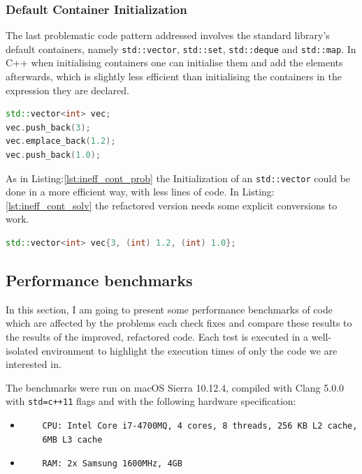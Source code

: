 \subsubsection{Default Container Initialization}
\par The last problematic code pattern addressed involves the standard library's default containers, namely \verb|std::vector|, \verb|std::set|, \verb|std::deque| and \verb|std::map|. In C++ when initialising containers one can initialise them and add the elements afterwards, which is slightly less efficient than initialising the containers in the expression they are declared. \medskip
\begin{lstlisting}[language=c++, frame=single ,caption={Inefficient way of creating containers}, label={lst:ineff_cont_prob}]
std::vector<int> vec;
vec.push_back(3);
vec.emplace_back(1.2);
vec.push_back(1.0);
\end{lstlisting}
\par As in Listing:\ref{lst:ineff_cont_prob} the Initialization of an \verb|std::vector| could be done in a more efficient way, with less lines of code. In Listing:\ref{lst:ineff_cont_solv}  the refactored version needs some explicit conversions to work.
\begin{lstlisting}[language=c++, frame=single ,caption={A faster way of initialising}, label={lst:ineff_cont_solv}]
std::vector<int> vec{3, (int) 1.2, (int) 1.0};
\end{lstlisting}
\subsection{Performance benchmarks}
\par In this section, I am going to present some performance benchmarks of code which are affected by the problems each check fixes and compare these results to the results of the improved, refactored code. Each test is executed in a well-isolated environment to highlight the execution times of only the code we are interested in. \medskip
\par The benchmarks were run on macOS Sierra 10.12.4, compiled with Clang 5.0.0 with \verb|std=c++11| flags and with the following hardware specification:
\begin{itemize}
	\item
	\begin{verbatim}
	CPU: Intel Core i7-4700MQ, 4 cores, 8 threads, 256 KB L2 cache,
	6MB L3 cache
	\end{verbatim}
	\item 
	\begin{verbatim}
	RAM: 2x Samsung 1600MHz, 4GB
	\end{verbatim}
\end{itemize} 
